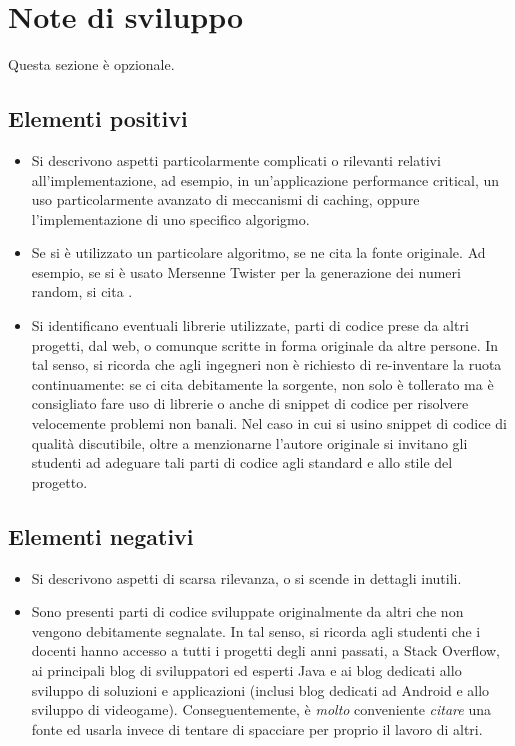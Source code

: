 \documentclass[a4paper,12pt]{report}
\begin{document}
\section{Note di sviluppo}

Questa sezione è opzionale.

\subsection*{Elementi positivi}

\begin{itemize}
 \item Si descrivono aspetti particolarmente complicati o rilevanti relativi all'implementazione, ad esempio, in un'applicazione performance critical, un uso particolarmente avanzato di meccanismi di caching, oppure l'implementazione di uno specifico algorigmo.
 \item Se si è utilizzato un particolare algoritmo, se ne cita la fonte originale. Ad esempio, se si è usato Mersenne Twister per la generazione dei numeri random, si cita \cite{mersenne}.
 \item Si identificano eventuali librerie utilizzate, parti di codice prese da altri progetti, dal web, o comunque scritte in forma originale da altre persone. In tal senso, si ricorda che agli ingegneri non è richiesto di re-inventare la ruota continuamente: se ci cita debitamente la sorgente, non solo è tollerato ma è consigliato fare uso di librerie o anche di snippet di codice per risolvere velocemente problemi non banali. Nel caso in cui si usino snippet di codice di qualità discutibile, oltre a menzionarne l'autore originale si invitano gli studenti ad adeguare tali parti di codice agli standard e allo stile del progetto.
\end{itemize}

\subsection*{Elementi negativi}
\begin{itemize}
 \item Si descrivono aspetti di scarsa rilevanza, o si scende in dettagli inutili.
 \item Sono presenti parti di codice sviluppate originalmente da altri che non vengono debitamente segnalate. In tal senso, si ricorda agli studenti che i docenti hanno accesso a tutti i progetti degli anni passati, a Stack Overflow, ai principali blog di sviluppatori ed esperti Java e ai blog dedicati allo sviluppo di soluzioni e applicazioni (inclusi blog dedicati ad Android e allo sviluppo di videogame). Conseguentemente, è \emph{molto} conveniente \emph{citare} una fonte ed usarla invece di tentare di spacciare per proprio il lavoro di altri.
\end{itemize}
\end{document}
